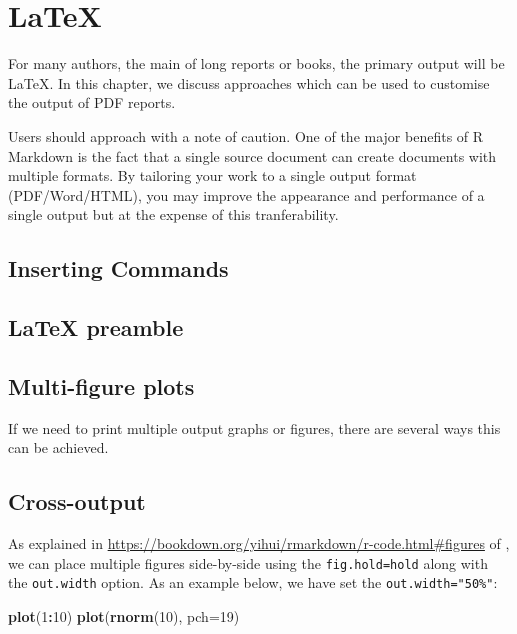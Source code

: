 \documentclass[]{book}
\newenvironment{Shaded}{\begin{snugshade}}{\end{snugshade}}
\newcommand{\KeywordTok}[1]{\textcolor[rgb]{0.13,0.29,0.53}{\textbf{#1}}}
\newcommand{\DataTypeTok}[1]{\textcolor[rgb]{0.13,0.29,0.53}{#1}}
\newcommand{\DecValTok}[1]{\textcolor[rgb]{0.00,0.00,0.81}{#1}}
\newcommand{\OperatorTok}[1]{\textcolor[rgb]{0.81,0.36,0.00}{\textbf{#1}}}
\newcommand{\NormalTok}[1]{#1}
\begin{document}
\chapter{LaTeX}\label{latex}

For many authors, the main of long reports or books, the primary output
will be LaTeX. In this chapter, we discuss approaches which can be used
to customise the output of PDF reports.

Users should approach with a note of caution. One of the major benefits
of R Markdown is the fact that a single source document can create
documents with multiple formats. By tailoring your work to a single
output format (PDF/Word/HTML), you may improve the appearance and
performance of a single output but at the expense of this
tranferability.

\section{Inserting Commands}\label{inserting-commands}

\section{LaTeX preamble}\label{latex-preamble}

\section{Multi-figure plots}\label{multi-figure-plots}

If we need to print multiple output graphs or figures, there are several
ways this can be achieved.

\section{Cross-output}\label{cross-output}

As explained in
\url{https://bookdown.org/yihui/rmarkdown/r-code.html\#figures} of
\citet{xie2018}, we can place multiple figures side-by-side using the
\texttt{fig.hold=\textquotesingle{}hold\textquotesingle{}} along with
the \texttt{out.width} option. As an example below, we have set the
\texttt{out.width="50\%"}:

\begin{Shaded}
\begin{Highlighting}[]
\KeywordTok{plot}\NormalTok{(}\DecValTok{1}\OperatorTok{:}\DecValTok{10}\NormalTok{)}
\KeywordTok{plot}\NormalTok{(}\KeywordTok{rnorm}\NormalTok{(}\DecValTok{10}\NormalTok{), }\DataTypeTok{pch=}\DecValTok{19}\NormalTok{)}
\end{Highlighting}
\end{Shaded}
\end{document}
